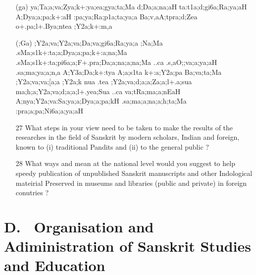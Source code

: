 \begin{itemize}
\begin{itemize}
                 \item[({\sktf ga})] {\sktf ya;Ta;a;va;Zya;k+:ya;ea;gya;ta;Ma
d;Da;a;na;aH ta:t1a;d;gi6a;Ra;ya;aH A;Dya;a;pa;k+:aH
:pa;ya;Ra;p1a;ta;ya;a Ba;v,aA;tpra;d;Zea o+.pa;l+.Bya;ntea ;Y2a;k+:m,a}
                 
                 \item[({\sktf ;Ga})] {\sktf ;Y2a;va;Y2a;va;Da;va;gi6a;Ra;ya;a%
;Na;Ma .sMa;s1k+:ta;a;Dya;a;pa;k+:a;na;Ma
.sMa;s1k+:ta;pi6a;a;F+.pra;Da;a;na;a;na;Ma ..ca .s,aO;;va;a;ya;aH .sa;ma;ya;a;n,a A;Y3a;Da;k+:tya
A;a;s1ta k+:a;Y2a;pa Ba;va;ta;Ma ;Y2a;va;va;[a;a
;Y2a;k nua .tea ;Y2a;va;d;a;a;Za;a;l+.a;sua
ma;h;a;Y2a;va;d;a;a;l+.yea;Sua ..ca va;tRa;ma;a;nEaH
A;nya;Y2a;va:Sa;ya;a;Dya;a;pa;kH .sa;ma;a;na;a;h;ta;Ma
:pra;a;pa;Ni6a;a;ya;aH}  
                 \end{itemize}
\end{itemize}

{\rm 
\begin{itemize}
\item[27] What steps in your view need to be taken to make the results of the researches in the field of Sanskrit by modern scholars, Indian and foreign, known to (i) traditional Pandits and (ii) to the general public ?

\item[28] What ways and mean at the national level would you suggest to help speedy publication of unpublished Sanskrit manuscripts and other Indological mateirial Preserved in museums and libraries (public and private) in foreign conutries ?
\end{itemize}
}

\section*{{\rm D.~ Organisation and Adiministration of Sanskrit Studies and Education}}

